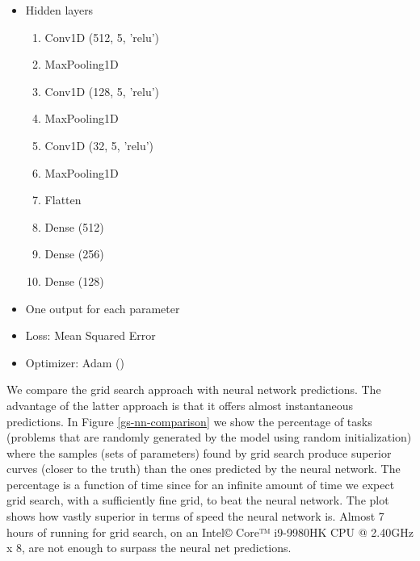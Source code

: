 \documentclass[11pt]{article}
\begin{document}
\begin{enumerate}
    \begin{itemize}
        \item Hidden layers 
        \begin{enumerate}
            \item Conv1D (512, 5, 'relu')
            \item MaxPooling1D
            \item Conv1D (128, 5, 'relu')
            \item MaxPooling1D
            \item Conv1D (32, 5, 'relu')
            \item MaxPooling1D
            \item Flatten
            \item Dense (512)
            \item Dense (256)
            \item Dense (128)
        \end{enumerate}
        \item One output for each parameter
        \item Loss: Mean Squared Error
        \item Optimizer: Adam (\cite{adam-opti})
    \end{itemize}
\end{enumerate}

We compare the grid search approach with neural network predictions. The advantage of the latter approach is that it offers almost instantaneous predictions. In Figure \ref{gs-nn-comparison} we show the percentage of tasks (problems that are randomly generated by the model using random initialization) where the samples (sets of parameters) found by grid search produce superior curves (closer to the truth) than the ones predicted by the neural network. The percentage is a function of time since for an infinite amount of time we expect grid search, with a sufficiently fine grid, to beat the neural network. The plot shows how vastly superior in terms of speed the neural network is. Almost 7 hours of running for grid search, on an Intel© Core™ i9-9980HK CPU @ 2.40GHz x 8, are not enough to surpass the neural net predictions.
\end{document}

